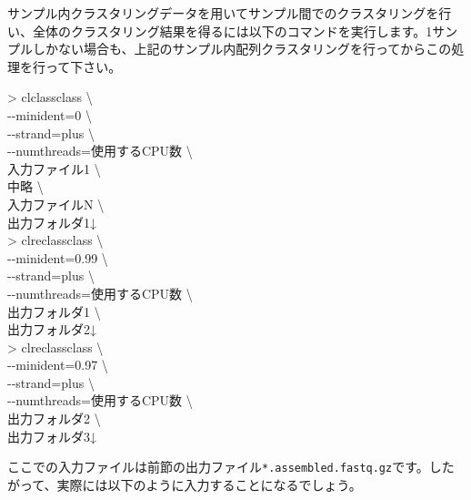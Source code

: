 \documentclass[titlepage,10pt,a4paper]{jsbook}
\newenvironment{cmd}{\begin{oframed}\raggedright\ttfamily\footnotesize\setlength{\baselineskip}{1.4em}}{\end{oframed}\vspace{-1em}}
\begin{document}
サンプル内クラスタリングデータを用いてサンプル間でのクラスタリングを行い、全体のクラスタリング結果を得るには以下のコマンドを実行します。1サンプルしかない場合も、上記のサンプル内配列クラスタリングを行ってからこの処理を行って下さい。
\begin{cmd}
{\textgreater} clclassclass {\textbackslash}\\
{-}{-}minident=0 {\textbackslash}\\
{-}{-}strand=plus {\textbackslash}\\
{-}{-}numthreads=使用するCPU数 {\textbackslash}\\
入力ファイル1 {\textbackslash}\\
中略 {\textbackslash}\\
入力ファイルN {\textbackslash}\\
出力フォルダ1↓\\
{\textgreater} clreclassclass {\textbackslash}\\
{-}{-}minident=0.99 {\textbackslash}\\
{-}{-}strand=plus {\textbackslash}\\
{-}{-}numthreads=使用するCPU数 {\textbackslash}\\
出力フォルダ1 {\textbackslash}\\
出力フォルダ2↓\\
{\textgreater} clreclassclass {\textbackslash}\\
{-}{-}minident=0.97 {\textbackslash}\\
{-}{-}strand=plus {\textbackslash}\\
{-}{-}numthreads=使用するCPU数 {\textbackslash}\\
出力フォルダ2 {\textbackslash}\\
出力フォルダ3↓
\end{cmd}
ここでの入力ファイルは前節の出力ファイル\texttt{*.assembled.fastq.gz}です。したがって、実際には以下のように入力することになるでしょう。
\end{document}
